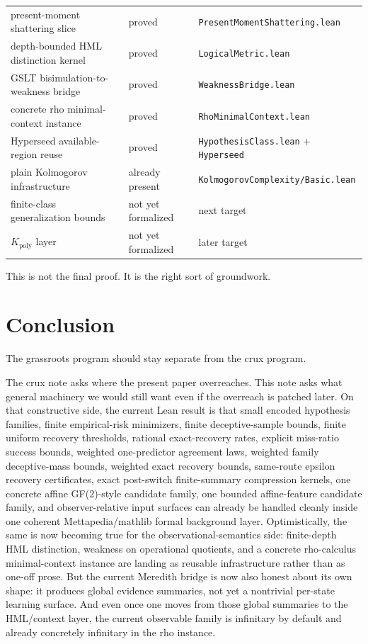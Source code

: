 \documentclass[11pt]{article}
\theoremstyle{remark}
\begin{document}
\begin{center}
\begin{tabular}{lll}
present-moment shattering slice & proved & \texttt{PresentMomentShattering.lean} \\
depth-bounded HML distinction kernel & proved & \texttt{LogicalMetric.lean} \\
GSLT bisimulation-to-weakness bridge & proved & \texttt{WeaknessBridge.lean} \\
concrete rho minimal-context instance & proved & \texttt{RhoMinimalContext.lean} \\
Hyperseed available-region reuse & proved & \texttt{HypothesisClass.lean} + \texttt{Hyperseed} \\
plain Kolmogorov infrastructure & already present & \texttt{KolmogorovComplexity/Basic.lean} \\
finite-class generalization bounds & not yet formalized & next target \\
\(K_{\mathrm{poly}}\) layer & not yet formalized & later target \\
\bottomrule
\end{tabular}
\end{center}

This is not the final proof.  It is the right sort of groundwork.

\section{Conclusion}

The grassroots program should stay separate from the crux program.

The crux note asks where the present paper overreaches.  This note asks what
general machinery we would still want even if the overreach is patched later.
On that constructive side, the current Lean result is that small encoded
hypothesis families, finite empirical-risk minimizers, finite deceptive-sample
bounds, finite uniform recovery thresholds, rational exact-recovery rates,
explicit miss-ratio success bounds, weighted one-predictor agreement laws,
weighted family deceptive-mass bounds, weighted exact recovery bounds,
same-route epsilon recovery certificates, exact post-switch finite-summary
compression kernels, one concrete affine GF(2)-style
candidate family, one bounded affine-feature candidate family, and
observer-relative input surfaces can already be handled cleanly inside one
coherent Mettapedia/mathlib formal background layer.  Optimistically, the same is
now becoming true for the observational-semantics side: finite-depth HML
distinction, weakness on operational quotients, and a concrete rho-calculus
minimal-context instance are landing as reusable infrastructure rather than as
one-off prose.  But the current Meredith bridge is now also honest about its own
shape: it produces global evidence summaries, not yet a nontrivial per-state
learning surface.  And even once one moves from those global summaries to the
HML/context layer, the current observable family is infinitary by default and
already concretely infinitary in the rho instance.
\end{document}
